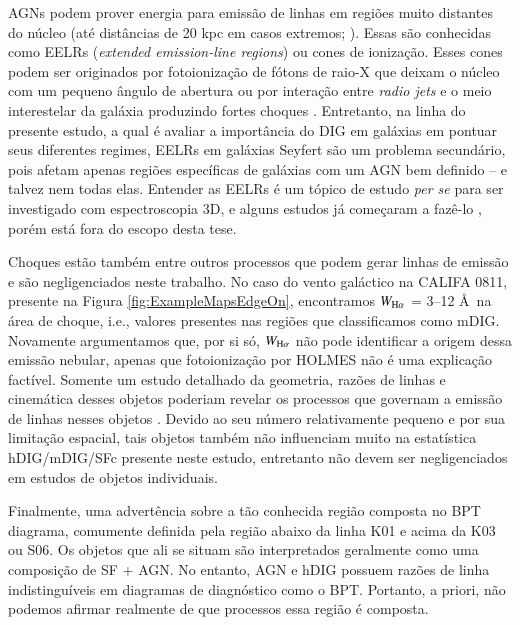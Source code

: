 AGNs podem prover energia para emissão de linhas em regiões muito distantes do núcleo (até distâncias de 20 kpc em casos extremos; \citealt{Veilleux.etal.2003}). Essas são conhecidas como EELRs ({\em extended emission-line regions}) ou cones de ionização. Esses cones podem ser originados por fotoionização de fótons de raio-X que deixam o núcleo com um pequeno ângulo de abertura ou por interação entre {\em radio jets} e o meio interestelar da galáxia produzindo fortes choques \citep{Wilson.1996}. Entretanto, na linha do presente estudo, a qual é avaliar a importância do DIG em galáxias em pontuar seus diferentes regimes, EELRs em galáxias Seyfert são um problema secundário, pois afetam apenas regiões específicas de galáxias com um AGN bem definido -- e talvez nem todas elas. Entender as EELRs é um tópico de estudo {\em per se} para ser investigado com espectroscopia 3D, e alguns estudos já começaram a fazê-lo \citep[e.g.,][]{Dopita.etal.2014}, porém está fora do escopo desta tese.

Choques estão também entre outros processos que podem gerar linhas de emissão e são negligenciados neste trabalho. No caso do vento galáctico na CALIFA 0811, presente na Figura \ref{fig:ExampleMapsEdgeOn}, encontramos $W_{\Ha}$ = 3--12 \AA\ na área de choque, i.e., valores presentes nas regiões que classificamos como mDIG. Novamente argumentamos que, por si só, $W_{\Ha}$  não pode identificar a origem dessa emissão nebular, apenas que fotoionização por HOLMES não é uma explicação factível. Somente um estudo detalhado da geometria, razões de linhas e cinemática desses objetos poderiam revelar os processos que governam a emissão de linhas nesses objetos \citep{Kreckel.etal.2014, Beirao.etal.2015, LopezCoba.etal.2017}. Devido ao seu número relativamente pequeno e por sua limitação espacial, tais objetos também não influenciam muito na estatística hDIG/mDIG/SFc presente neste estudo, entretanto não devem ser negligenciados em estudos de objetos individuais.

Finalmente, uma advertência sobre a tão conhecida região composta no BPT diagrama, comumente definida pela região abaixo da linha K01 e acima da K03 ou S06. Os objetos que ali se situam são interpretados geralmente como uma composição de SF + AGN. No entanto, AGN e hDIG possuem razões de linha indistinguíveis em diagramas de diagnóstico como o BPT. Portanto, a priori, não podemos afirmar realmente de que processos essa região é composta.

